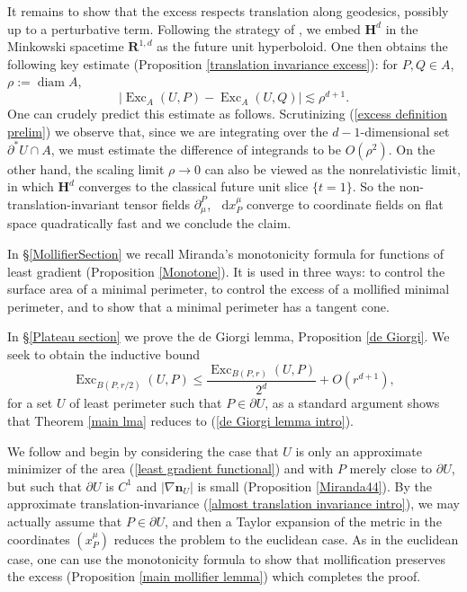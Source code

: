 \documentclass[reqno,11pt]{amsart}
\newcommand{\RR}{\mathbf{R}}
\newcommand{\Hyp}{\mathbf H}
\DeclareMathOperator{\diam}{diam}
\DeclareMathOperator{\Exc}{Exc}
\newcommand*\dif{\mathop{}\!\mathrm{d}}
\newcommand{\normal}{\mathbf n}
\theoremstyle{definition}
\numberwithin{equation}{section}
\begin{document}
It remains to show that the excess respects translation along geodesics, possibly up to a perturbative term.
Following the strategy of \cite{daskalopoulosPrep1}, we embed $\Hyp^d$ in the Minkowski spacetime $\RR^{1, d}$ as the future unit hyperboloid.
One then obtains the following key estimate (Proposition \ref{translation invariance excess}): for $P, Q \in A$, $\rho := \diam A$,
\begin{equation}\label{almost translation invariance intro}
|\Exc_A(U, P) - \Exc_A(U, Q)| \lesssim \rho^{d + 1}.
\end{equation}
One can crudely predict this estimate as follows.
Scrutinizing (\ref{excess definition prelim}) we observe that, since we are integrating over the $d-1$-dimensional set $\partial^* U \cap A$, we must estimate the difference of integrands to be $O(\rho^2)$.
On the other hand, the scaling limit $\rho \to 0$ can also be viewed as the nonrelativistic limit, in which $\Hyp^d$ converges to the classical future unit slice $\{t = 1\}$.
So the non-translation-invariant tensor fields $\partial_\mu^P$, $\dif x^\mu_P$ converge to coordinate fields on flat space quadratically fast and we conclude the claim.

In \S\ref{MollifierSection} we recall Miranda's monotonicity formula \cite[Teorema 3.2]{Miranda66} for functions of least gradient (Proposition \ref{Monotone}).
It is used in three ways: to control the surface area of a minimal perimeter, to control the excess of a mollified minimal perimeter, and to show that a minimal perimeter has a tangent cone.

In \S\ref{Plateau section} we prove the de Giorgi lemma, Proposition \ref{de Giorgi}.
We seek to obtain the inductive bound
\begin{equation}\label{de Giorgi lemma intro}
\Exc_{B(P, r/2)}(U, P) \leq \frac{\Exc_{B(P, r)}(U, P)}{2^d} + O(r^{d + 1}),
\end{equation}
for a set $U$ of least perimeter such that $P \in \partial U$, as a standard argument shows that Theorem \ref{main lma} reduces to (\ref{de Giorgi lemma intro}).

We follow \cite[Chapters 6-7]{Giusti77} and begin by considering the case that $U$ is only an approximate minimizer of the area (\ref{least gradient functional}) and with $P$ merely close to $\partial U$, but such that $\partial U$ is $C^1$ and $|\nabla \normal_U|$ is small (Proposition \ref{Miranda44}).
By the approximate translation-invariance (\ref{almost translation invariance intro}), we may actually assume that $P \in \partial U$, and then a Taylor expansion of the metric in the coordinates $(x^\mu_P)$ reduces the problem to the euclidean case.
As in the euclidean case, one can use the monotonicity formula to show that mollification preserves the excess (Proposition \ref{main mollifier lemma}) which completes the proof.
\end{document}
